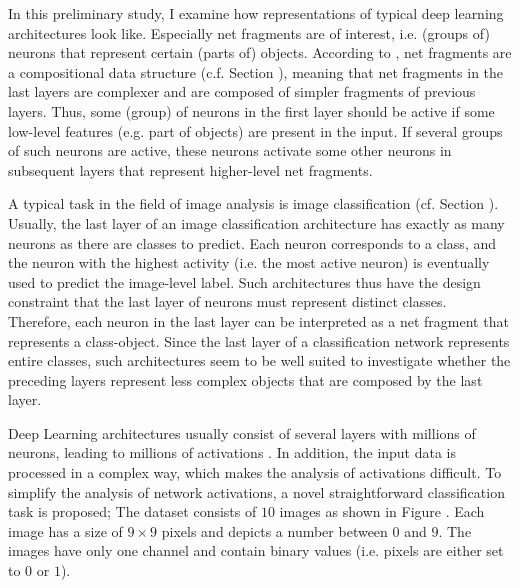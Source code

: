 In this preliminary study, I examine how representations of typical deep learning architectures look like.
Especially net fragments are of interest, i.e. (groups of) neurons that represent certain (parts of) objects.
According to , net fragments are a compositional data structure (c.f. Section ), meaning that net fragments in the last layers are complexer and are composed of simpler fragments of previous layers.
Thus, some (group) of neurons in the first layer should be active if some low-level features (e.g. part of objects) are present in the input.
If several groups of such neurons are active, these neurons activate some other neurons in subsequent layers that represent higher-level net fragments.

A typical task in the field of image analysis is image classification (cf. Section ).
Usually, the last layer of an image classification architecture has exactly as many neurons as there are classes to predict.
Each neuron corresponds to a class, and the neuron with the highest activity (i.e. the most active neuron) is eventually used to predict the image-level label.
Such architectures thus have the design constraint that the last layer of neurons must represent distinct classes.
Therefore, each neuron in the last layer can be interpreted as a net fragment that represents a class-object.
Since the last layer of a classification network represents entire classes, such architectures seem to be well suited to investigate whether the preceding layers represent less complex objects that are composed by the last layer.

Deep Learning architectures usually consist of several layers with millions of neurons, leading to millions of activations \cite{Szegedy_Liu_Jia_Sermanet_Reed_Anguelov_Erhan_Vanhoucke_Rabinovich_2014, He_Zhang_Ren_Sun_2016, Ronneberger_Fischer_Brox_2015, He_Gkioxari_Dollar_Girshick_2017, Liu_Anguelov_Erhan_Szegedy_Reed_Fu_Berg_2016, Redmon_Divvala_Girshick_Farhadi_2016}.
In addition, the input data is processed in a complex way, which makes the analysis of activations difficult.
To simplify the analysis of network activations, a novel straightforward classification task is proposed;
The dataset consists of $10$ images as shown in Figure .
Each image has a size of $9\times9$ pixels and depicts a number between $0$ and $9$.
The images have only one channel and contain binary values (i.e. pixels are either set to $0$ or $1$).

